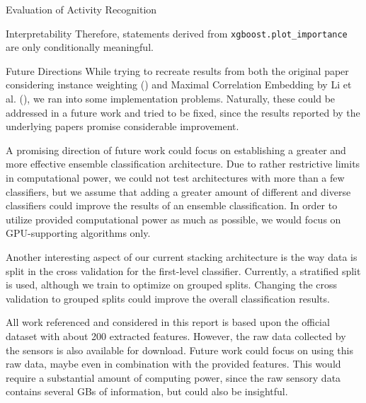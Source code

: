 \begin{section}{Evaluation of Activity Recognition}
\begin{subsection}{Interpretability}
    Therefore, statements derived from \texttt{xgboost.plot\_importance} are only conditionally meaningful.

\end{subsection}	
	
	\begin{subsection}{Future Directions}
		While trying to recreate results from both the original paper considering instance weighting (\cite{Vaizman18}) and Maximal Correlation Embedding by Li et al. (\cite{Li19}), we ran into some implementation problems. Naturally, these could be addressed in a future work and tried to be fixed, since the results reported by the underlying papers promise considerable improvement. \par
		A promising direction of future work could focus on establishing a greater and more effective ensemble classification architecture. Due to rather restrictive limits in computational power, we could not test architectures with more than a few classifiers, but we assume that adding a greater amount of different and diverse classifiers could improve the results of an ensemble classification. In order to utilize provided computational power as much as possible, we would focus on GPU-supporting algorithms only. \par
		Another interesting aspect of our current stacking architecture is the way data is split in the cross validation for the first-level classifier. Currently, a stratified split is used, although we train to optimize on grouped splits. Changing the cross validation to grouped splits could improve the overall classification results. \par
		All work referenced and considered in this report is based upon the official dataset with about 200 extracted features. However, the raw data collected by the sensors is also available for download. Future work could focus on using this raw data, maybe even in combination with the provided features. This would require a substantial amount of computing power, since the raw sensory data contains several GBs of information, but could also be insightful.
		
	\end{subsection}
\end{section}
